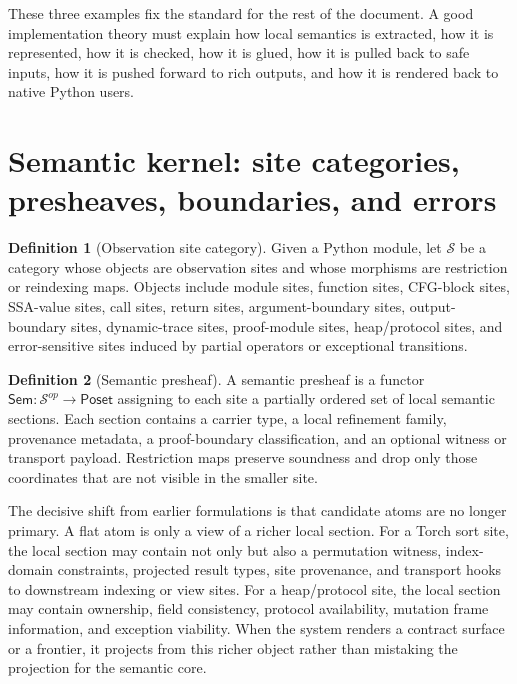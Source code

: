 \documentclass[11pt]{report}
\newcommand{\Sem}{\ensuremath{\mathsf{Sem}}}
\DeclareRobustCommand{\py}[1]{\texttt{\detokenize{#1}}}
\theoremstyle{definition}
\newtheorem{definition}{Definition}[section]
\theoremstyle{plain}
\begin{document}
These three examples fix the standard for the rest of the document. A good
implementation theory must explain how local semantics is extracted, how it is
represented, how it is checked, how it is glued, how it is pulled back to safe
inputs, how it is pushed forward to rich outputs, and how it is rendered back to
native Python users.


\section{Semantic kernel: site categories, presheaves, boundaries, and errors}

\begin{definition}[Observation site category]
Given a Python module, let $\mathcal{S}$ be a category whose objects are
observation sites and whose morphisms are restriction or reindexing maps.
Objects include module sites, function sites, CFG-block sites, SSA-value sites,
call sites, return sites, argument-boundary sites, output-boundary sites,
dynamic-trace sites, proof-module sites, heap/protocol sites, and
error-sensitive sites induced by partial operators or exceptional transitions.
\end{definition}

\begin{definition}[Semantic presheaf]
A semantic presheaf is a functor $\Sem : \mathcal{S}^{op} \to \mathsf{Poset}$
assigning to each site a partially ordered set of local semantic sections. Each
section contains a carrier type, a local refinement family, provenance metadata,
a proof-boundary classification, and an optional witness or transport payload.
Restriction maps preserve soundness and drop only those coordinates that are not
visible in the smaller site.
\end{definition}

The decisive shift from earlier formulations is that candidate atoms are no
longer primary. A flat atom is only a view of a richer local section. For a
Torch sort site, the local section may contain not only \py{sorted(result)} but
also a permutation witness, index-domain constraints, projected result types,
site provenance, and transport hooks to downstream indexing or view sites. For a
heap/protocol site, the local section may contain ownership, field consistency,
protocol availability, mutation frame information, and exception viability. When
the system renders a contract surface or a frontier, it projects from this
richer object rather than mistaking the projection for the semantic core.
\end{document}

